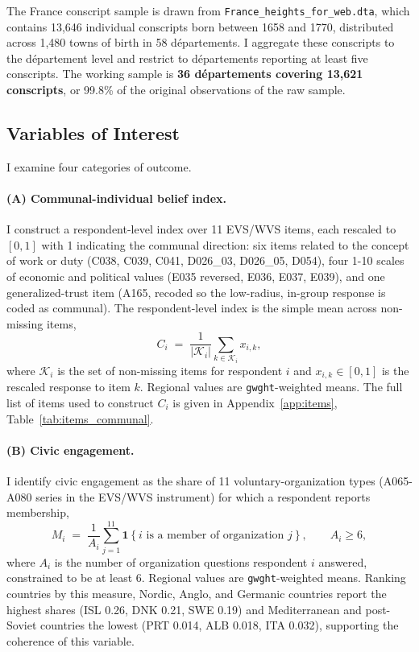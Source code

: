\documentclass[11pt]{article}
\begin{document}
The France conscript sample is drawn from \texttt{France\_heights\_for\_web.dta}, which contains 13{,}646 individual conscripts born between 1658 and 1770, distributed across 1{,}480 towns of birth in 58 départements. I aggregate these conscripts to the département level and restrict to départements reporting at least five conscripts. The working sample is \textbf{36 départements covering 13{,}621 conscripts}, or 99.8\% of the original observations of the raw sample.

\subsection{Variables of Interest}
I examine four categories of outcome.

\paragraph{(A) Communal-individual belief index.} I construct a respondent-level index over 11 EVS/WVS items, each rescaled to $[0,1]$ with 1 indicating the communal direction: six items related to the concept of work or duty (C038, C039, C041, D026\_03, D026\_05, D054), four 1-10 scales of economic and political values (E035 reversed, E036, E037, E039), and one generalized-trust item (A165, recoded so the low-radius, in-group response is coded as communal). The respondent-level index is the simple mean across non-missing items,
\begin{equation}\label{eq:communal}
C_i \;=\; \frac{1}{|\mathcal{K}_i|}\sum_{k \in \mathcal{K}_i} x_{i,k},
\end{equation}
where $\mathcal{K}_i$ is the set of non-missing items for respondent $i$ and $x_{i,k} \in [0,1]$ is the rescaled response to item $k$. Regional values are \texttt{gwght}-weighted means. The full list of items used to construct $C_i$ is given in Appendix~\ref{app:items}, Table~\ref{tab:items_communal}.

\paragraph{(B) Civic engagement.} I identify civic engagement as the share of 11 voluntary-organization types (A065-A080 series in the EVS/WVS instrument) for which a respondent reports membership,
\begin{equation}\label{eq:civic}
M_i \;=\; \frac{1}{A_i}\sum_{j=1}^{11} \mathbf{1}\!\left\{i \text{ is a member of organization } j\right\}, \qquad A_i \geq 6,
\end{equation}
where $A_i$ is the number of organization questions respondent $i$ answered, constrained to be at least 6. Regional values are \texttt{gwght}-weighted means. Ranking countries by this measure, Nordic, Anglo, and Germanic countries report the highest shares (ISL 0.26, DNK 0.21, SWE 0.19) and Mediterranean and post-Soviet countries the lowest (PRT 0.014, ALB 0.018, ITA 0.032), supporting the coherence of this variable.
\end{document}

